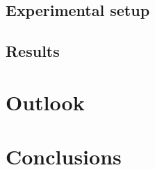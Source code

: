 \documentclass[pdftex, sectionletters]{pittetd}    %
\begin{document}
\section{Experimental setup}

\section{Results}

\chapter{Outlook}
	
\chapter{Conclusions}


%
\appendix                          %
\listoftables
\listoffigures
%
\end{document}
